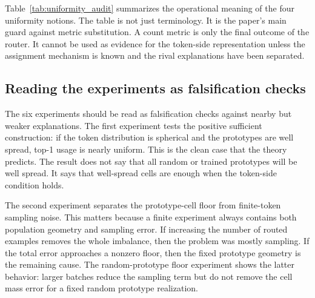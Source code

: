 \begin{table}[t]
\centering
\caption{Operational role of the four uniformity notions.}
\label{tab:uniformity_audit}
\small
\setlength{\tabcolsep}{3pt}
\end{table}

Table~\ref{tab:uniformity_audit} summarizes the operational meaning of the four
uniformity notions. The table is not just terminology. It is the paper's main
guard against metric substitution. A count metric is only the final outcome of
the router. It cannot be used as evidence for the token-side representation
unless the assignment mechanism is known and the rival explanations have been
separated.

\subsection{Reading the experiments as falsification checks}

The six experiments should be read as falsification checks against nearby but
weaker explanations. The first experiment tests the positive sufficient
construction: if the token distribution is spherical and the prototypes are
well spread, top-1 usage is nearly uniform. This is the clean case that the
theory predicts. The result does not say that all random or trained prototypes
will be well spread. It says that well-spread cells are enough when the
token-side condition holds.

The second experiment separates the prototype-cell floor from finite-token
sampling noise. This matters because a finite experiment always contains both
population geometry and sampling error. If increasing the number of routed
examples removes the whole imbalance, then the problem was mostly sampling. If
the total error approaches a nonzero floor, then the fixed prototype geometry is
the remaining cause. The random-prototype floor experiment shows the latter
behavior: larger batches reduce the sampling term but do not remove the cell
mass error for a fixed random prototype realization.


